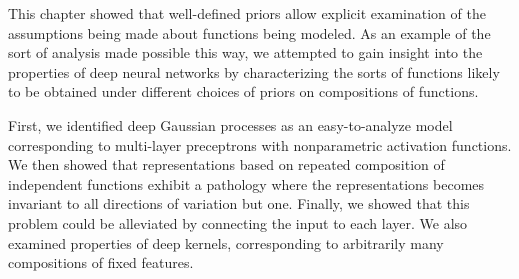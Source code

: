
This chapter showed that well-defined priors allow explicit examination of the assumptions being made about functions being modeled.
As an example of the sort of analysis made possible this way, we attempted to gain insight into the properties of deep neural networks by characterizing the sorts of functions likely to be obtained under different choices of priors on compositions of functions.

First, we identified deep Gaussian processes as an easy-to-analyze model corresponding to multi-layer preceptrons with nonparametric activation functions.
%
We then showed that representations based on repeated composition of independent functions exhibit a pathology where the representations becomes invariant to all directions of variation but one. %
Finally, we showed that this problem could be alleviated by connecting the input to each layer.
%
We also examined properties of deep kernels, corresponding to arbitrarily many compositions of fixed features.

